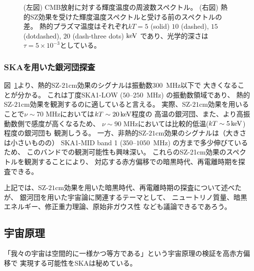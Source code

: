 \begin{figure}[t]
\begin{minipage}{0.5\hsize}
\begin{center}
 \end{center}
 \end{minipage}
\caption{(左図) CMB放射に対する輝度温度の周波数スペクトル。
(右図) 熱的SZ効果を受けた輝度温度スペクトルと受ける前のスペクトルの差。
熱的プラズマ温度はそれぞれ$kT = 5$ (solid) $10$ (dashed), $15$ (dotdashed), $20$ (dash-three dots) ${\rm keV}$
であり、光学的深さは$\tau =5\times 10^{-3}$としている\citep{Colafrancesco2014}。}
\label{fig:brightnessT} 
\end{figure}


\subsubsection{SKAを用いた銀河団探査}

図~\ref{fig:brightnessT}より、熱的SZ-$21$cm効果のシグナルは振動数$300$~MHz以下で
大きくなることが分かる。
これは丁度SKA1-LOW ($50$--$250$~MHz) の振動数領域であり、
熱的SZ-$21$cm効果を観測するのに適していると言える。
実際、SZ-$21$cm効果を用いることで$\nu\sim 70$ MHzにおいては$kT\sim 20\,{\rm keV}$程度の
高温の銀河団、また、より高振動数側で感度が高くなるため、
$\nu\sim 90$ MHzにおいては比較的低温($kT\sim 5\,{\rm keV}$)程度の銀河団も
観測しうる。
一方、非熱的SZ-$21$cm効果のシグナルは（大きさは小さいものの）
SKA1-MID band 1 ($350$--$1050$~MHz) の方まで多少伸びているため、
このバンドでの観測可能性も興味深い。
これらのSZ-21cm効果のスペクトルを観測することにより、
対応する赤方偏移での暗黒時代、再電離時期を探査できる。

上記では、SZ-$21$cm効果を用いた暗黒時代、再電離時期の探査について述べたが、
銀河団を用いた宇宙論に関連するテーマとして、
ニュートリノ質量、暗黒エネルギー、修正重力理論、原始非ガウス性
なども議論できるであろう。



\subsection{宇宙原理}\label{cosmology.s2.ss8}

「我々の宇宙は空間的に一様かつ等方である」という宇宙原理の検証を高赤方偏移で
実現する可能性をSKAは秘めている。

